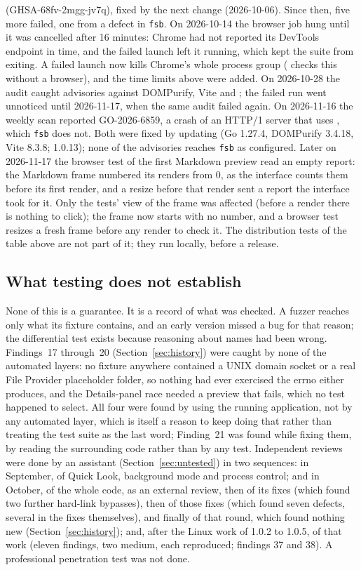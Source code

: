 (GHSA-68fv-2mgg-jv7q), fixed by the next change (2026-10-06).  Since then, five more
failed, one from a defect in \texttt{fsb}.  On 2026-10-14 the browser job hung until it
was cancelled after 16 minutes: Chrome had not reported its DevTools endpoint in time,
and the failed launch left it running, which kept the suite from exiting.  A failed
launch now kills Chrome's whole process group ( checks this
without a browser), and the time limits above were added.  On 2026-10-28 the audit caught
advisories against DOMPurify, Vite and ; the failed run went unnoticed
until 2026-11-17, when the same audit failed again.  On 2026-11-16 the weekly scan
reported GO-2026-6859, a crash of an HTTP/1 server that uses , which
\texttt{fsb} does not.  Both were fixed by updating (Go 1.27.4, DOMPurify 3.4.18, Vite
8.3.8; 1.0.13); none of the advisories reaches \texttt{fsb} as configured.  Later on
2026-11-17 the browser test of the first Markdown preview read an empty report: the
Markdown frame numbered its renders from 0, as the interface counts them before its first
render, and a resize before that render sent a report the interface took for it.  Only the
tests' view of the frame was affected (before a render there is nothing to click); the
frame now starts with no number, and a browser test resizes a fresh frame before any render
to check it.  The distribution tests of
the table above are not part of it; they run locally, before a release.

\subsection{What testing does not establish}

None of this is a guarantee.  It is a record of what was checked.  A fuzzer reaches only what
its fixture contains, and an early version missed a bug for that reason; the differential test
exists because reasoning about names had been wrong.  Findings~17 through~20
(Section~\ref{sec:history}) were caught by none of the automated layers: no fixture
anywhere contained a UNIX domain socket or a real File Provider placeholder folder, so
nothing had ever exercised the errno either produces, and the Details-panel race needed a
preview that fails, which no test happened to select.  All four were found by using the
running application, not by any automated layer, which is itself a reason to keep doing
that rather than treating the test suite as the last word; Finding~21 was found while
fixing them, by reading the surrounding code rather than by any test.  Independent
reviews were done by an assistant (Section~\ref{sec:untested}) in two sequences: in
September, of Quick Look, background mode and process control; and in October, of the whole
code, as an external review, then of its fixes (which found two further hard-link
bypasses), then of those fixes (which found seven defects, several in the fixes
themselves), and finally of that round, which found nothing new
(Section~\ref{sec:history}); and, after the Linux work of 1.0.2 to 1.0.5, of that work
(eleven findings, two medium, each reproduced; findings 37 and 38).  A professional penetration test was not done.

